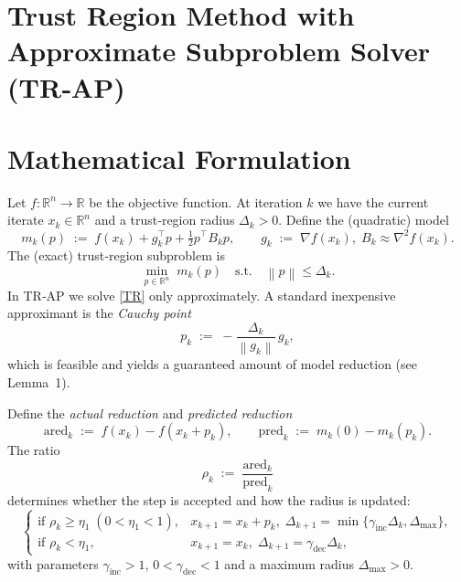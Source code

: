 \documentclass{article}
\newcommand{\norm}[1]{\left\lVert#1\right\rVert}
\newcommand{\R}{\mathbb{R}}
\begin{document}
\section*{Trust Region Method with Approximate Subproblem Solver (TR‑AP)}

\section*{Mathematical Formulation}
Let $f:\R^{n}\rightarrow\R$ be the objective function.  
At iteration $k$ we have the current iterate $x_{k}\in\R^{n}$ and a trust‑region radius
$\Delta_{k}>0$.  
Define the (quadratic) model
\[
m_{k}(p)\;:=\;f(x_{k})+g_{k}^{\top}p+\tfrac12 p^{\top}B_{k}p,
\qquad 
g_{k}\;:=\;\nabla f(x_{k}),\; B_{k}\approx\nabla^{2}f(x_{k}).
\]
The (exact) trust‑region subproblem is
\[
\min_{p\in\R^{n}}\; m_{k}(p)\quad\text{s.t.}\quad \norm{p}\le \Delta_{k}.
\tag{TR}
\]
In TR‑AP we solve \eqref{TR} only approximately.  
A standard inexpensive approximant is the \emph{Cauchy point}
\[
p_{k}\;:=\; -\frac{\Delta_{k}}{\norm{g_{k}}}\,g_{k},
\tag{1}
\]
which is feasible and yields a guaranteed amount of model reduction (see Lemma~1).  

Define the \emph{actual reduction} and \emph{predicted reduction}
\[
\text{ared}_{k}\;:=\;f(x_{k})-f(x_{k}+p_{k}),\qquad
\text{pred}_{k}\;:=\;m_{k}(0)-m_{k}(p_{k}).
\]
The ratio
\[
\rho_{k}\;:=\;\frac{\text{ared}_{k}}{\text{pred}_{k}}
\tag{2}
\]
determines whether the step is accepted and how the radius is updated:
\[
\begin{cases}
\text{if }\rho_{k}\ge \eta_{1} \;(0<\eta_{1}<1), & 
   x_{k+1}=x_{k}+p_{k},\;\Delta_{k+1}=
   \min\{\gamma_{\text{inc}}\Delta_{k},\Delta_{\max}\},\\[0.2em]
\text{if }\rho_{k}<\eta_{1}, &
   x_{k+1}=x_{k},\;\Delta_{k+1}= \gamma_{\text{dec}}\Delta_{k},
\end{cases}
\tag{3}
\]
with parameters $\gamma_{\text{inc}}>1$, $0<\gamma_{\text{dec}}<1$ and a maximum radius $\Delta_{\max}>0$.
\end{document}

